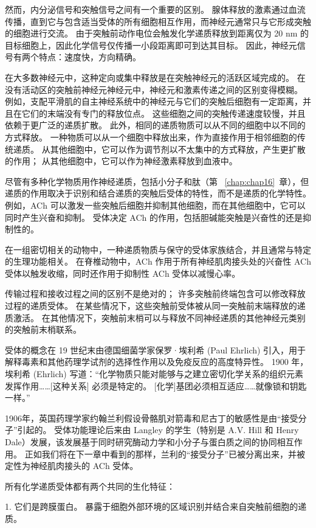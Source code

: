 然而，内分泌信号和突触信号之间有一个重要的区别。
腺体释放的激素通过血流传播，直到它与包含适当受体的所有细胞相互作用，而神经元通常只与它形成突触的细胞进行交流。
由于突触前动作电位会触发化学递质释放到距离仅为 20 nm 的目标细胞上，因此化学信号仅传播一小段距离即可到达其目标。 
因此，神经元信号有两个特点：速度快，方向精确。


在大多数神经元中，这种定向或集中释放是在突触神经元的活跃区域完成的。
在没有活动区的突触前神经元神经元中，神经元和激素传递之间的区别变得模糊。
例如，支配平滑肌的自主神经系统中的神经元与它们的突触后细胞有一定距离，并且在它们的末端没有专门的释放位点。
这些细胞之间的突触传递速度较慢，并且依赖于更广泛的递质扩散。
此外，相同的递质物质可以从不同的细胞中以不同的方式释放。
一种物质可以从一个细胞中释放出来，作为直接作用于相邻细胞的传统递质。
从其他细胞中，它可以作为调节剂以不太集中的方式释放，产生更扩散的作用；
从其他细胞中，它可以作为神经激素释放到血液中。


尽管有多种化学物质用作神经递质，包括小分子和肽（第 ~\ref{chap:chap16}~章），但递质的作用取决于识别和结合递质的突触后受体的特性，而不是递质的化学特性。
例如，ACh 可以激发一些突触后细胞并抑制其他细胞，而在其他细胞中，它可以同时产生兴奋和抑制。
受体决定 ACh 的作用，包括胆碱能突触是兴奋性的还是抑制性的。


在一组密切相关的动物中，一种递质物质与保守的受体家族结合，并且通常与特定的生理功能相关。
在脊椎动物中，ACh 作用于所有神经肌肉接头处的兴奋性 ACh 受体以触发收缩，同时还作用于抑制性 ACh 受体以减慢心率。


传输过程和接收过程之间的区别不是绝对的；
许多突触前终端包含可以修改释放过程的递质受体。
在某些情况下，这些突触前受体被从同一突触前末端释放的递质激活。
在其他情况下，突触前末梢可以与释放不同神经递质的其他神经元类别的突触前末梢联系。


受体的概念在 19 世纪末由德国细菌学家保罗·埃利希 (Paul Ehrlich) 引入，用于解释毒素和其他药理学试剂的选择性作用以及免疫反应的高度特异性。
1900 年，埃利希 (Ehrlich) 写道：“化学物质只能对能够与之建立密切化学关系的组织元素发挥作用……[这种关系] 必须是特定的。
[化学]基团必须相互适应……就像锁和钥匙一样。”


1906年，英国药理学家约翰兰利假设骨骼肌对箭毒和尼古丁的敏感性是由“接受分子”引起的。
受体功能理论后来由 Langley 的学生（特别是 A.V. Hill 和 Henry Dale）发展，该发展基于同时研究酶动力学和小分子与蛋白质之间的协同相互作用。
正如我们将在下一章中看到的那样，兰利的“接受分子”已被分离出来，并被定性为神经肌肉接头的 ACh 受体。


所有化学递质受体都有两个共同的生化特征：

1. 它们是跨膜蛋白。
暴露于细胞外部环境的区域识别并结合来自突触前细胞的递质。



